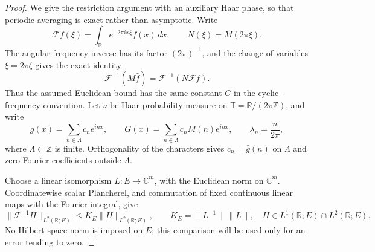 \documentclass[11pt]{article}
\numberwithin{equation}{section}
\theoremstyle{remark}
\theoremstyle{definition}
\begin{document}
\begin{proof}
We give the restriction argument with an auxiliary Haar phase, so that
periodic averaging is exact rather than asymptotic.  Write
\[
 \mathscr F f(\xi)=\int_{\mathbb R}e^{-2\pi i x\xi}f(x)\,dx,
 \qquad N(\xi)=M(2\pi\xi).
\]
The angular-frequency inverse has its factor $(2\pi)^{-1}$, and the
change of variables $\xi=2\pi\zeta$ gives the exact identity
\[
 \mathcal F^{-1}(M\widehat f)
 =\mathscr F^{-1}(N\mathscr F f).
\]
Thus the assumed Euclidean bound has the same constant $C$ in the
cyclic-frequency convention.  Let $\nu$ be Haar probability measure on
$\mathbb T=\mathbb R/(2\pi\mathbb Z)$, and write
\[
 g(x)=\sum_{n\in\Lambda}c_ne^{inx},\qquad
 G(x)=\sum_{n\in\Lambda}c_nM(n)e^{inx},\qquad
 \lambda_n=\frac{n}{2\pi},
\]
where $\Lambda\subset\mathbb Z$ is finite.  Orthogonality of the
characters gives $c_n=\widehat g(n)$ on $\Lambda$ and zero Fourier
coefficients outside $\Lambda$.

Choose a linear isomorphism $L:E\to\mathbb C^m$, with the Euclidean norm
on $\mathbb C^m$.  Coordinatewise scalar Plancherel, and commutation of
fixed continuous linear maps with the Fourier integral, give
\[
 \|\mathscr F^{-1}H\|_{L^2(\mathbb R;E)}
 \le K_E\|H\|_{L^2(\mathbb R;E)},\qquad
 K_E=\|L^{-1}\|\,\|L\|,
 \quad H\in L^1(\mathbb R;E)\cap L^2(\mathbb R;E).
\]
No Hilbert-space norm is imposed on $E$; this comparison will be used
only for an error tending to zero.


\end{proof}
\end{document}
